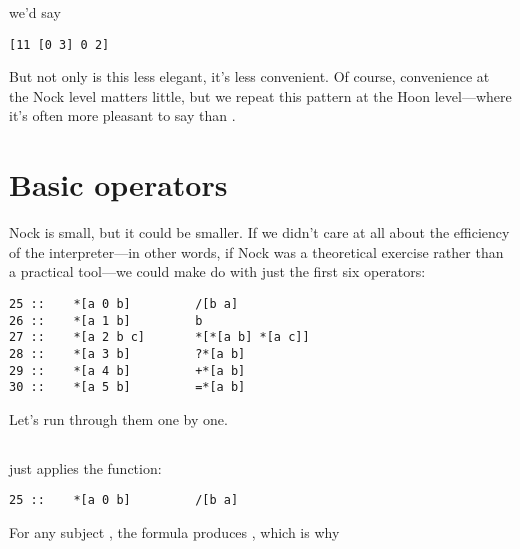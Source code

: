 we'd say

\begin{framed_shaded}
\begin{Verbatim}[fontsize=\relsize{-2.5},fontseries=b,commandchars=\\\{\}]
[11 [0 3] 0 2]
\end{Verbatim}
\end{framed_shaded}

But not only is this less elegant, it's less convenient.  Of
course, convenience at the Nock level matters little, but we
repeat this pattern at the Hoon level---where it's often more
pleasant to say \kode{[a b]} than .

\section{Basic operators}

Nock is small, but it could be smaller.  If we didn't care at all
about the efficiency of the interpreter---in other words, if Nock
was a theoretical exercise rather than a practical tool---we
could make do with just the first six operators:

\begin{framed_shaded}
\begin{Verbatim}[fontsize=\relsize{-2.5},fontseries=b,commandchars=\\\{\}]
25 ::    *[a 0 b]         /[b a]
26 ::    *[a 1 b]         b
27 ::    *[a 2 b c]       *[*[a b] *[a c]]
28 ::    *[a 3 b]         ?*[a b]
29 ::    *[a 4 b]         +*[a b]
30 ::    *[a 5 b]         =*[a b]
\end{Verbatim}
\end{framed_shaded}

Let's run through them one by one.

\subsection{}

 just applies the \kode{/} function:

\begin{framed_shaded}
\begin{Verbatim}[fontsize=\relsize{-2.5},fontseries=b,commandchars=\\\{\}]
25 ::    *[a 0 b]         /[b a]
\end{Verbatim}
\end{framed_shaded}

For any subject , the formula \kode{[0 b]} produces \kode{/[b a]}, which
is why

